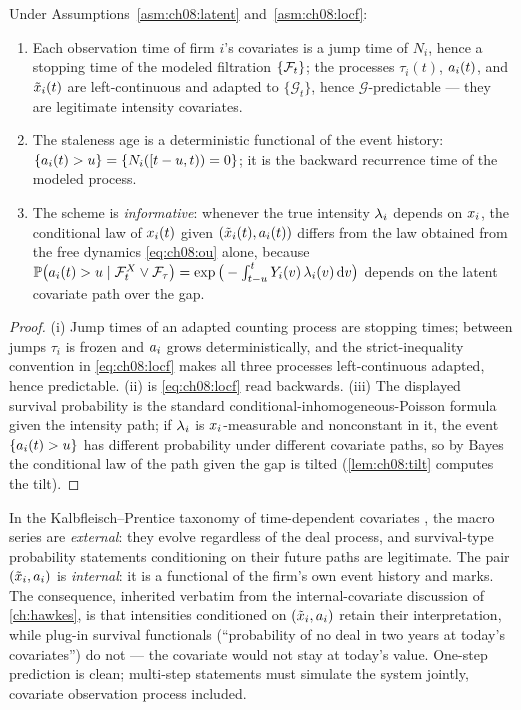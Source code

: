 \begin{proposition}
\label{prop:ch08:internal}
Under Assumptions~\ref{asm:ch08:latent} and~\ref{asm:ch08:locf}:
\begin{enumerate}[label=(\roman*)]
\item Each observation time of firm $i$'s covariates is a jump time of
$N_i$, hence a stopping time of the modeled filtration $\{\mathcal{F}_{t}\}$; the
processes $\tau_i(t)$, $a_i(t)$, and $\tilde{x}_i(t)$ are
left-continuous and adapted to $\{\mathcal{G}_t\}$, hence
$\mathcal{G}$-predictable --- they are legitimate intensity covariates.
\item The staleness age is a deterministic functional of the event
history: $\{a_i(t) > u\} = \{N_i([t-u, t)) = 0\}$; it is the
backward recurrence time of the modeled process.
\item The scheme is \emph{informative}: whenever the true intensity
$\lambda_i$ depends on $x_i$, the conditional law of $x_i(t)$ given
$(\tilde{x}_i(t), a_i(t))$ differs from the law obtained from
the free dynamics \cref{eq:ch08:ou} alone, because
$\mathbb{P}\big(a_i(t) > u \mid \mathcal{F}^{X}_t \vee \mathcal{F}_{\tau}\big) =
\exp\big(-\int_{t-u}^{t} Y_i(v)\,\lambda_i(v)\,\mathrm{d} v\big)$ depends on
the latent covariate path over the gap.
\end{enumerate}
\end{proposition}

\begin{proof}
(i) Jump times of an adapted counting process are stopping times; between
jumps $\tau_i$ is frozen and $a_i$ grows deterministically, and
the strict-inequality convention in \cref{eq:ch08:locf} makes all three
processes left-continuous adapted, hence predictable. (ii) is
\cref{eq:ch08:locf} read backwards. (iii) The displayed survival
probability is the standard conditional-inhomogeneous-Poisson formula
given the intensity path; if $\lambda_i$ is $x_i$-measurable and
nonconstant in it, the event $\{a_i(t) > u\}$ has different
probability under different covariate paths, so by Bayes the conditional
law of the path given the gap is tilted (\cref{lem:ch08:tilt} computes
the tilt).
\end{proof}

In the Kalbfleisch--Prentice taxonomy of time-dependent covariates
\citep[Ch.~6]{kalbfleisch2002}, the macro series are \emph{external}:
they evolve regardless of the deal process, and survival-type
probability statements conditioning on their future paths are legitimate.
The pair $(\tilde{x}_i, a_i)$ is \emph{internal}: it is a
functional of the firm's own event history and marks. The consequence,
inherited verbatim from the internal-covariate discussion of
\cref{ch:hawkes}, is that intensities conditioned on
$(\tilde{x}_i,a_i)$ retain their interpretation, while plug-in
survival functionals (``probability of no deal in two years at today's
covariates'') do not --- the covariate would not stay at today's value.
One-step prediction is clean; multi-step statements must simulate the
system jointly, covariate observation process included.

